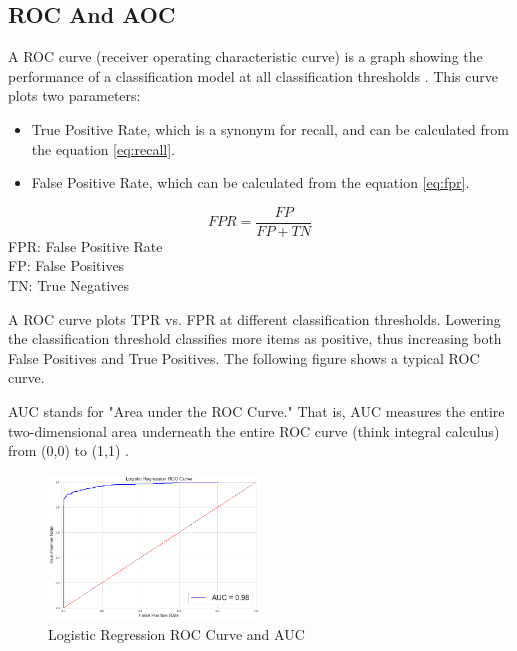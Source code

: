 \documentclass[conference]{IEEEtran}
\begin{document}
\subsection{ROC And AOC}

A ROC curve (receiver operating characteristic curve) is a graph showing the performance of a classification model at all classification thresholds \cite{roc_auc}. This curve plots two parameters:

\begin{itemize}
\item True Positive Rate, which is a synonym for recall, and can be calculated from the equation \ref{eq:recall}.
\item False Positive Rate, which can be calculated from the equation \ref{eq:fpr}.
\end{itemize}

\begin{center}
  \begin{equation} \label{eq:fpr}
    FPR = \frac{FP}{FP + TN}
  \end{equation}
  FPR: False Positive Rate \\
  FP: False Positives \\
  TN: True Negatives
\end{center}

A ROC curve plots TPR vs. FPR at different classification thresholds. Lowering the classification threshold classifies more items as positive, thus increasing both False Positives and True Positives. The following figure shows a typical ROC curve.

AUC stands for "Area under the ROC Curve." That is, AUC measures the entire two-dimensional area underneath the entire ROC curve (think integral calculus) from (0,0) to (1,1) \cite{roc_auc}.

\begin{figure}[H]
    \centering\includegraphics[width=0.5\textwidth]{images/roc_auc.png}
    \caption{Logistic Regression ROC Curve and AUC}
    \label{fig:roc_auc}
\end{figure}
\end{document}
